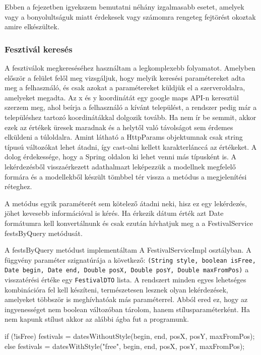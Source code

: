 
Ebben a fejezetben igyekszem bemutatni néhány izgalmasabb esetet, amelyek vagy a bonyolultságuk miatt érdekesek vagy számomra rengeteg fejtörést okoztak amire elkészültek.

\subsubsection{Fesztivál keresés}
A fesztiválok megkereséséhez használtam a legkomplexebb folyamatot. Amelyben először a felület felől meg vizsgáljuk, hogy melyik keresési paramétereket adta meg a felhasználó, és csak azokat a paramétereket küldjük el a szerveroldalra, amelyeket megadta. Az x és y koordinátát egy google maps API-n keresztül szerzem meg, ahol beírja a felhasználó a kívánt települést, a rendszer pedig már a településhez tartozó koordinátákkal dolgozik tovább. Ha nem ír be semmit, akkor ezek az értékek üresek maradnak és a helytől való távolságot sem érdemes elküldeni a túloldalra. Amint látható a HttpParams objektumnak csak string típusú változókat lehet átadni, így cast-olni kellett karakterlánccá az értékeket. A dolog érdekessége, hogy a Spring oldalon ki lehet venni más típusként is.
A lekérdezésből visszaérkezett adathalmazt leképezzük a modellnek megfelelő formára és a modellekből készült tömbbel tér vissza a metódus a megjelenítési réteghez.

A metódus egyik paraméterét sem kötelező átadni neki, hisz ez egy lekérdezés, jöhet kevesebb információval is kérés. Ha érkezik dátum érték azt Date formátumra kell konvertálnunk és csak ezután hívhatjuk meg a a FestivalService festsByQuery metódusát.

A festsByQuery metódust implementáltam A FestivalServiceImpl osztályban. A függvény paraméter szignatúrája a következő: \texttt{(String style, boolean isFree, Date begin, Date end, Double posX, Double posY, Double maxFromPos)} a visszatérési értéke egy \texttt{FestivalDTO} lista. A rendszert minden egyes lehetséges kombinációra fel kell készíteni, természetesen lesznek olyan lekérdezések, amelyeket többször is meghívhatóak más paraméterrel. Abból ered ez, hogy az ingyenességet nem boolean változóban tárolom, hanem stílusparaméterként.
Ha nem kapunk stílust akkor az alábbi ágba fut a programunk.
\begin{java}
if (!isFree) {
festivals = datesWithoutStyle(begin, end, posX, posY, 
maxFromPos);
} else {
    festivals = datesWithStyle("free", begin, end, posX, posY,
    maxFromPos);
}
\end{java}

